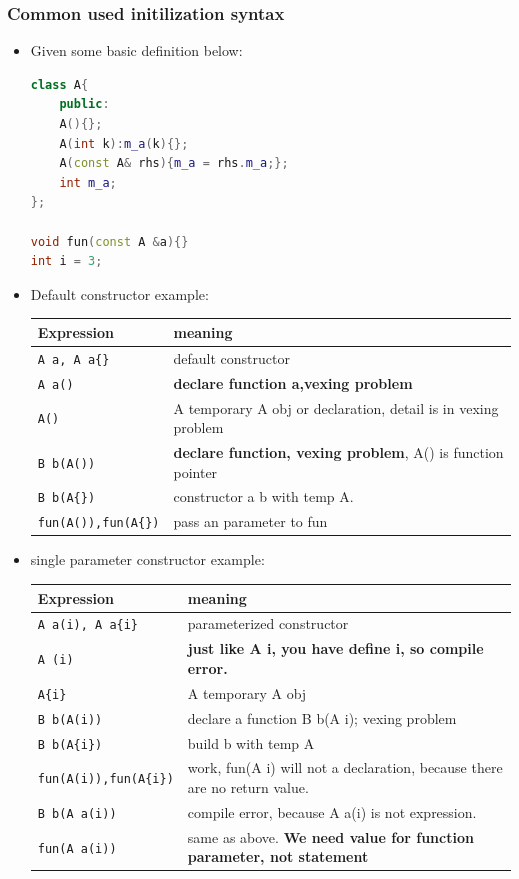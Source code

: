 \documentclass[a4paper,11pt,twoside]{book}
\newcommand{\tophline}{\hline }
\newcommand{\bottomhline}{\\ \hline }
\newcommand{\tophline}{ }
\newcommand{\bottomhline}{ }
\begin{document}
\subsubsection{Common used initilization syntax}
\begin{itemize}
	\item Given some basic definition below: 
\begin{lstlisting}[frame=single, language=c++]
class A{
	public:
	A(){};
	A(int k):m_a(k){};
	A(const A& rhs){m_a = rhs.m_a;};
	int m_a;
};

void fun(const A &a){}
int i = 3;	
\end{lstlisting}	
	
	\item Default constructor example:\\ 
	\begin{tabular}{|p{}|p{}|}
		\tophline
		Expression & meaning \\
		\tophline
		\texttt{A a, A a\{\}} & default constructor \\
		\tophline
		\texttt{A a()} & \textbf{declare function a,vexing problem} \\
		\tophline
		\texttt{A()} & A temporary A obj or declaration, detail is in vexing problem \\
		\tophline
		\texttt{B b(A())} & \textbf{declare function, vexing problem}, A() is function pointer \\
		\tophline
		\texttt{B b(A\{\})} & constructor a b with temp A. \\
		\tophline
		\texttt{fun(A()),fun(A\{\})} & pass an parameter to fun
		\bottomhline
	\end{tabular}

	\item single parameter constructor example: \\ 
	
	\begin{tabular}{|p{}|p{}|}
		\tophline
		Expression & meaning \\
		\tophline
		\texttt{A a(i), A a\{i\}} & parameterized constructor\\
		\tophline
		\texttt{A (i)} & \textbf{just like A i, you have define i, so compile error.} \\
		\tophline
		\texttt{A\{i\}} & A temporary A obj\\
		\tophline
		\texttt{B b(A(i))} & declare a function B b(A i); vexing problem \\
		\tophline
		\texttt{B b(A\{i\})} & build b with temp A\\
		\tophline
		\texttt{fun(A(i)),fun(A\{i\})} & work, fun(A i) will not a declaration, because there are no return value.\\
		\tophline
		\texttt{B b(A a(i))}  & compile error, because A a(i) is not expression. \\
		\tophline
		\texttt{fun(A a(i))} & same as above. \textbf{We need value for function parameter, not statement} 
		\bottomhline
	\end{tabular}
	

\end{itemize}
\end{document}
